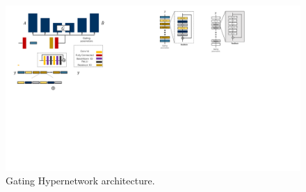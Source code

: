 

\begin{figure}
    \centering
    \includegraphics{paper_images/hypernet.pdf}
    \caption{Gating Hypernetwork architecture.}
    \label{fig:gating_arch}
\end{figure}

